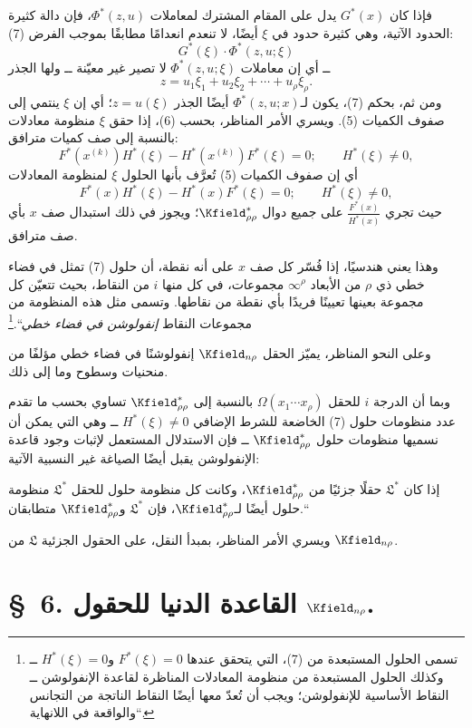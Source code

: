 \documentclass[11pt]{article}
\providecommand{\glqq}{\textquotedblbase}
\providecommand{\grqq}{\textquotedblleft}
\newcommand{\srcLTR}[1]{\relax\ifmmode\text{\mbox{\babelsublr{\foreignlanguage{english}{#1}}}}\else\babelsublr{\foreignlanguage{english}{#1}}\fi}
\newcommand{\srcfn}[2]{\begingroup\renewcommand{\thefootnote}{\srcLTR{#1}}\footnote{#2}\addtocounter{footnote}{-1}\endgroup}
\providecommand{\Lsys}{\mathfrak{L}}
\begin{document}
فإذا كان $G^*(x)$ يدل على المقام المشترك لمعاملات $\Phi^*(z,u)$، فإن دالة كثيرة الحدود الآتية، وهي كثيرة حدود في $\xi$ أيضًا، لا تنعدم انعدامًا مطابقًا بموجب الفرض (7):
\[
G^*(\xi)\cdot\Phi^*(z,u;\xi)
\]
ــ أي إن معاملات $\Phi^*(z,u;\xi)$ لا تصير غير معيّنة ــ ولها الجذر
\[
z=u_1\xi_1+u_2\xi_2+\cdots+u_\rho\xi_\rho.
\]
ومن ثم، بحكم (7)، يكون لـ$\Phi^*(z,u;x)$ أيضًا الجذر $z=u(\xi)$؛ أي إن $\xi$ ينتمي إلى صفوف الكميات (5). ويسري الأمر المناظر، بحسب (6)، إذا حقق $\xi$ منظومة معادلات بالنسبة إلى صف كميات مترافق:
\[
F^*(x^{(k)})H^*(\xi)-H^*(x^{(k)})F^*(\xi)=0;\qquad H^*(\xi)\ne0,
\]
أي إن صفوف الكميات (5) تُعرَّف بأنها الحلول $\xi$ لمنظومة المعادلات
\[
F^*(x)H^*(\xi)-H^*(x)F^*(\xi)=0;\qquad H^*(\xi)\ne0,
\]
حيث تجري $\frac{F^*(x)}{H^*(x)}$ على جميع دوال $\Kfield^*_{\rho\rho}$؛ ويجوز في ذلك استبدال صف $x$ بأي صف مترافق.

وهذا يعني هندسيًا، إذا فُسّر كل صف $x$ على أنه نقطة، أن حلول (7) تمثل في فضاء خطي ذي $\rho$ من الأبعاد $\infty^\rho$ مجموعات، في كل منها $i$ من النقاط، بحيث تتعيّن كل مجموعة بعينها تعيينًا فريدًا بأي نقطة من نقاطها. وتسمى مثل هذه المنظومة من مجموعات النقاط \glqq{}\emph{إنفولوشن في فضاء خطي}\grqq{}.\srcfn{*)}{تسمى الحلول المستبعدة من (7)، التي يتحقق عندها $F^*(\xi)=0$ و$H^*(\xi)=0$ ــ وكذلك الحلول المستبعدة من منظومة المعادلات المناظرة لقاعدة الإنفولوشن ــ النقاط الأساسية للإنفولوشن؛ ويجب أن تُعدّ معها أيضًا النقاط الناتجة من التجانس والواقعة \glqq{}في اللانهاية\grqq{}.}

وعلى النحو المناظر، يميّز الحقل $\Kfield_{n\rho}$ إنفولوشنًا في فضاء خطي مؤلفًا من منحنيات وسطوح وما إلى ذلك.

وبما أن الدرجة $i$ للحقل $\Omega(x_1\cdots x_\rho)$ بالنسبة إلى $\Kfield^*_{\rho\rho}$ تساوي بحسب ما تقدم عدد منظومات حلول (7) الخاضعة للشرط الإضافي $H^*(\xi)\ne0$ ــ وهي التي يمكن أن نسميها منظومات حلول $\Kfield^*_{\rho\rho}$ ــ فإن الاستدلال المستعمل لإثبات وجود قاعدة الإنفولوشن يقبل أيضًا الصياغة غير النسبية الآتية:

\glqq{}إذا كان $\Lsys^*$ حقلًا جزئيًا من $\Kfield^*_{\rho\rho}$، وكانت كل منظومة حلول للحقل $\Lsys^*$ منظومة حلول أيضًا لـ$\Kfield^*_{\rho\rho}$، فإن $\Lsys^*$ و$\Kfield^*_{\rho\rho}$ متطابقان.\grqq{}

ويسري الأمر المناظر، بمبدأ النقل، على الحقول الجزئية $\Lsys$ من $\Kfield_{n\rho}$.

\section*{\S\ 6. القاعدة الدنيا للحقول $\Kfield_{n\rho}$.}
\end{document}
